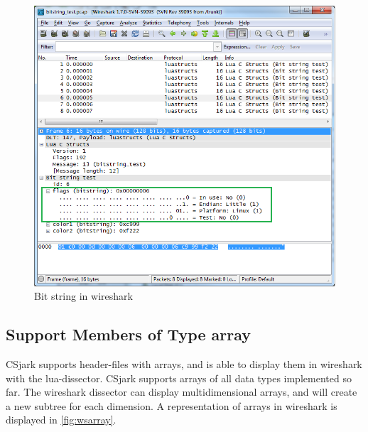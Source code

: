 \begin{figure}[htb]
	\center
	\includegraphics[width=\textwidth]{./sprints/img/wireshark_bitstring}
	\caption{Bit string in \Gls{wireshark}\label{fig:wsbitstring}}
\end{figure}



\subsection{Support Members of Type \Gls{array}}
CSjark supports \gls{header}-files with \glspl{array}, and is able to display them in 
\Gls{wireshark} with the \Gls{lua}-\gls{dissector}. CSjark supports \glspl{array} of all data types 
implemented so far. The \Gls{wireshark} \gls{dissector} can display multidimensional 
\glspl{array}, and will create a new subtree for each dimension.  A representation of 
\glspl{array} in \Gls{wireshark} is displayed in \autoref{fig:wsarray}.

